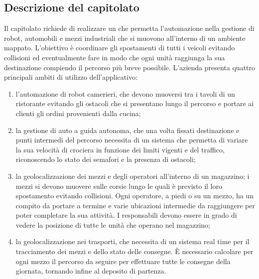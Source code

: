 \subsection{Descrizione del capitolato}
Il capitolato richiede di realizzare un  che permetta l’automazione nella gestione di robot, automobili e mezzi industriali che si muovono all’interno di un ambiente mappato. L’obiettivo è coordinare gli spostamenti di tutti i veicoli evitando collisioni ed eventualmente fare in modo che ogni unità raggiunga la sua destinazione compiendo il percorso più breve possibile.
L’azienda presenta quattro principali ambiti di utilizzo dell’applicativo:
\begin{enumerate}
    \item l’automazione di robot camerieri, che devono muoversi tra i tavoli di un ristorante evitando gli ostacoli che si presentano lungo il percorso e portare ai clienti gli ordini provenienti dalla cucina;
    \item la gestione di auto a guida autonoma, che una volta fissati destinazione e punti intermedi del percorso necessita di un sistema che permetta di variare la sua velocità di crociera in funzione dei limiti vigenti e del traffico, riconoscendo lo stato dei semafori e la presenza di ostacoli;
    \item la geolocalizzazione dei mezzi e degli operatori all’interno di un magazzino; i mezzi si devono muovere sulle corsie lungo le quali è previsto il loro spostamento evitando collisioni. Ogni operatore, a piedi o su un mezzo, ha un compito da portare a termine e varie ubicazioni intermedie da raggiungere per poter completare la sua attività. I responsabili devono essere in grado di vedere la posizione di tutte le unità che operano nel magazzino;
    \item la geolocalizzazione nei trasporti, che necessita di un sistema real time per il tracciamento dei mezzi e dello stato delle consegne. È necessario calcolare per ogni mezzo il percorso da seguire per effettuare tutte le consegne della giornata, tornando infine al deposito di partenza.
\end{enumerate}

